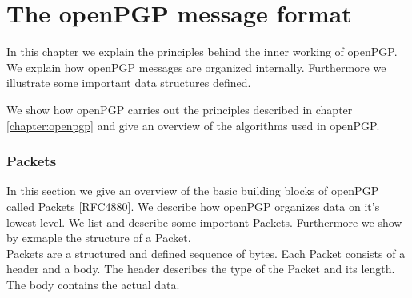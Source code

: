 \chapter{The openPGP message format} \label{chapter:messageformat}









In this chapter we explain the principles behind the inner working of openPGP. We explain how openPGP messages are organized internally. Furthermore we illustrate some important data structures defined.

We show how openPGP carries out the principles described in chapter \ref{chapter:openpgp} and give an overview of the algorithms used in openPGP.

\subsection{Packets}

In this section we give an overview of the basic building blocks of openPGP called Packets [RFC4880]. We describe how openPGP organizes data on it's lowest level. We list and describe some important Packets. Furthermore we show by exmaple the structure of a Packet.  \\

Packets are a structured and defined sequence of bytes.  Each Packet consists of a header and a body. The header describes the type of the Packet and its length. The body contains the actual data.

